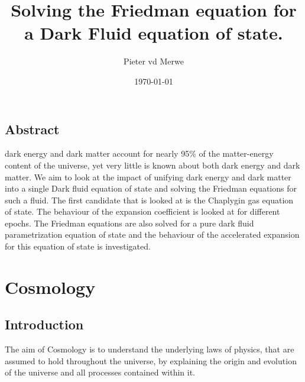 \documentclass[a4paper, 11pt]{FSKH_623_Report}
\title{Solving the Friedman equation for a Dark Fluid equation of state.}
\author{Pieter vd Merwe}
\date{\today}
\numberwithin{equation}{section}
\begin{document}
\maketitle
\pagebreak
\section*{Abstract}
dark energy and dark matter account for nearly 95\% of the matter-energy content of the universe, yet very little is known about both dark energy and dark matter. We aim to look at the impact of unifying dark energy and dark matter into a single Dark fluid equation of state and solving the Friedman equations for such a fluid. The first candidate that is looked at is the Chaplygin gas equation of state. The behaviour of the expansion coefficient is looked at for different epochs. The Friedman equations are also solved for a pure dark fluid parametrization equation of state and the behaviour of the accelerated expansion for this equation of state is investigated.
\pagebreak
{}   
\tableofcontents[]                                                 
\pagebreak

\chapter{Cosmology}
\section{Introduction}
The aim of Cosmology is to understand the underlying laws of physics, that are assumed to hold throughout the universe, by explaining the origin and evolution of the universe and all processes contained within it. 
\end{document}

